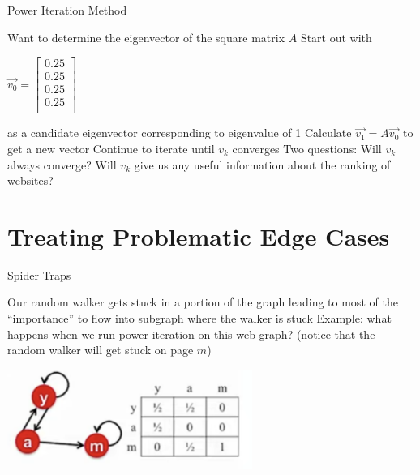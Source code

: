 \documentclass{beamer}
\begin{document}
\begin{frame}[t]{Power Iteration Method}
\begin{outline}
    \1 Want to determine the eigenvector of the square matrix $A$
    \1 Start out with 
    \begin{center}
        $\vec{v_0} = \begin{bmatrix}
            0.25 \\ 0.25 \\ 0.25 \\ 0.25 \\
        \end{bmatrix}$
    \end{center}
    as a candidate eigenvector corresponding to eigenvalue of 1
    \1 Calculate $\vec{v_1} = A\vec{v_0}$ to get a new vector
    \1 Continue to iterate until $v_k$ converges 
    \1 Two questions:
        \2 Will $v_k$ always converge?
        \2 Will $v_k$ give us any useful information about the ranking of websites?
\end{outline}
\end{frame}

\section{Treating Problematic Edge Cases}
\begin{frame}[t]{Spider Traps}
\begin{outline}
    \1 Our random walker gets stuck in a portion of the graph leading to most of the “importance” to flow into subgraph where the walker is stuck
    \1 Example: what happens when we run power iteration on this web graph? (notice that the random walker will get stuck on page $m$)
    \begin{center}
        \includegraphics[width=0.6\textwidth]{spider.png}
    \end{center}
\end{outline}
\end{frame}
\end{document}
